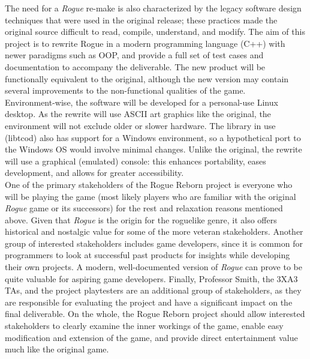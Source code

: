 \documentclass{article}
\begin{document}
The need for a \textit{Rogue} re-make is also characterized by the legacy software design techniques that were used in the original release; these practices made the original source difficult to read, compile, understand, and modify.  The aim of this project is to rewrite Rogue in a modern programming language (C++) with newer paradigms such as OOP, and provide a full set of test cases and documentation to accompany the deliverable.  The new product will be functionally equivalent to the original, although the new version may contain several improvements to the non-functional qualities of the game.\\

Environment-wise, the software will be developed for a personal-use Linux desktop.  As the rewrite will use ASCII art graphics like the original, the environment will not exclude older or slower hardware.  The library in use (libtcod) also has support for a Windows environment, so a hypothetical port to the Windows OS would involve minimal changes.  Unlike the original, the rewrite will use a graphical (emulated) console: this enhances portability, eases development, and allows for greater accessibility.\\

One of the primary stakeholders of the Rogue Reborn project is everyone who will be playing the game (most likely players who are familiar with the original \textit{Rogue} game or its successors) for the rest and relaxation reasons mentioned above.  Given that \textit{Rogue} is the origin for the roguelike genre, it also offers historical and nostalgic value for some of the more veteran stakeholders.  Another group of interested stakeholders includes game developers, since it is common for programmers to look at successful past products for insights while developing their own projects.  A modern, well-documented version of \textit{Rogue} can prove to be quite valuable for aspiring game developers.  Finally, Professor Smith, the 3XA3 TAs, and the project playtesters are an additional group of stakeholders, as they are responsible for evaluating the project and have a significant impact on the final deliverable.  On the whole, the Rogue Reborn project should allow interested stakeholders to clearly examine the inner workings of the game, enable easy modification and extension of the game, and provide direct entertainment value much like the original game.
\end{document}
